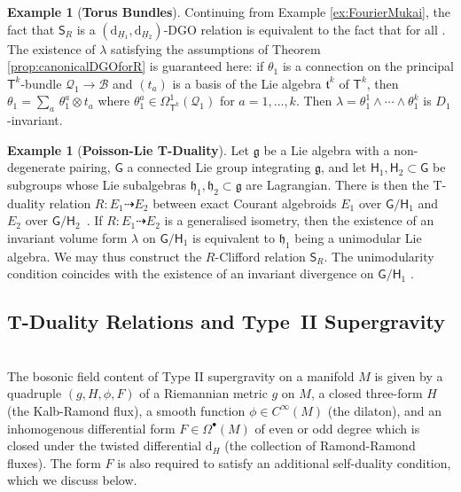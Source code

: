 \documentclass[a4paper, reqno, 11pt]{amsart}
\numberwithin{equation}{section}
\theoremstyle{definition}
\newtheorem{example}[equation]{Example}
\newcommand{\red}[1]{\underline{#1}}
\newcommand{\frk}[1]{\mathfrak{#1}}
\newcommand{\de}{\mathrm{d}}
\newcommand{\frg}{\mathfrak{g}}
\newcommand{\frh}{\mathfrak{h}}
\newcommand{\cB}{{\mathcal B}}
\newcommand{\cQ}{{\mathcal Q}}
\newcommand{\sfS}{{\mathsf{S}}}
\newcommand{\sfT}{{\mathsf{T}}}
\newcommand{\sfH}{{\mathsf{H}}}
\newcommand{\sfG}{{\mathsf{G}}}
\newcommand{\sfOmega}{{\mathsf{\Omega}}}
\newcommand{\rel}{\dashrightarrow}
\theoremstyle{remark}
\begin{document}
\begin{example}[\textbf{Torus Bundles}]
    Continuing from Example \ref{ex:FourierMukai}, the fact that $\sfS_R$ is a $(\de_{\red H{}_1}, \de_{\red H{}_2})$-DGO relation is equivalent to the fact that \smash{$\de_{\red H{}_2} \varrho(\omega) = (-1)^k\,\varrho(\de_{\red H{}_1} \omega)$} for all \smash{$\omega\in\sfOmega_{\sfT^k}^\bullet(\cQ_1)$}. The existence of $\lambda$ satisfying the assumptions of Theorem \ref{prop:canonicalDGOforR} is guaranteed here: if $\theta_1$ is a connection on the principal $\sfT^k$-bundle $\cQ_1 \to \cB$ and $(t_a)$ is a basis of the Lie algebra $\frk{t}^k$ of $\sfT^k$, then $\theta_1 = \sum_a\, \theta_1^a \otimes t_a$ where $\theta_1^a\in\sfOmega^1_{\sfT^k}(\cQ_1)$ for $a=1,\dots,k$. Then $\lambda = \theta_1^1 \wedge \cdots \wedge \theta_1^k$ is $D_1$-invariant.
\end{example}

\begin{example}[\textbf{Poisson-Lie T-Duality}]
    Let $\frg$ be a Lie algebra with a non-degenerate pairing, $\sfG$ a connected Lie group integrating $\frg$, and let $\sfH_1, \sfH_2\subset \sfG$ be subgroups whose Lie subalgebras $\frh_1, \frh_2\subset \frg$ are Lagrangian. There is then the T-duality relation $R \colon E_1 \rel E_2$ between exact Courant algebroids $E_1$ over $\sfG/\sfH_1$ and $E_2$ over $\sfG/ \sfH_2$~\cite{Vysoky2020hitchiker,deFraja2025Ricci}. If $R\colon E_1 \rel E_2$ is a generalised isometry, then the existence of an invariant volume form $\lambda$ on $\sfG/ \sfH_1$ is equivalent to $\frh_1$ being a unimodular Lie algebra. We may thus construct the $R$-Clifford relation $\sfS_{R}$. The unimodularity condition coincides with the existence of an invariant divergence on $\sfG/\sfH_1$ \cite[Example 2.5]{Severa:2018pag}.
\end{example}

\medskip

\subsection{T-Duality Relations and Type~II Supergravity}~\\[5pt]
\label{sub:TDualitySUGRA}
The bosonic field content of Type II supergravity on a manifold $M$ is given by a quadruple $(g,H, \phi, F)$ of a Riemannian metric $g$ on $M$, a closed three-form $H$ (the Kalb-Ramond flux), a smooth function $\phi\in C^\infty(M)$ (the dilaton), and an inhomogenous differential form $F\in \sfOmega^\bullet(M)$  of even or odd degree which is closed under the twisted differential $\de_H$ (the collection of Ramond-Ramond fluxes). The form $F$ is also required to satisfy an additional self-duality condition, which we discuss below. 
\end{document}
